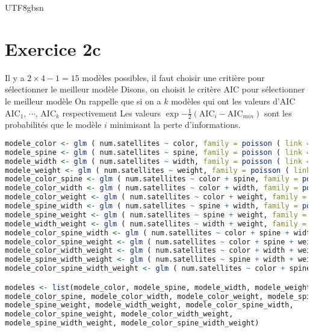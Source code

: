 \documentclass[../main.tex]{subfiles}
\begin{document}
\begin{CJK*}{UTF8}{gbsn}
\section*{Exercice 2c}
 Il y a $2 \times 4-1=15$ modèles possibles, il faut choisir une critière pour sélectionner le meilleur modèle
Disons, on choisit le critère AIC pour sélectionner le meilleur modèle
On rappelle que si on a $k$ modèles qui ont les valeurs d'AIC $\text{AIC}_1$, $\cdots$, $\text{AIC}_k$ respectivement
Les valeurs $\exp{-\frac{1}{2}(\text{AIC}_i - \text{AIC}_{min})}$ sont les probabilités que le modèle $i$
minimisant la perte d'informations.

\begin {lstlisting}[language=R]
modele_color <- glm ( num.satellites ~ color, family = poisson ( link = log ) ,data = hcrabs ) 
modele_spine <- glm ( num.satellites ~ spine, family = poisson ( link = log ) ,data = hcrabs )
modele_width <- glm ( num.satellites ~ width, family = poisson ( link = log ) ,data = hcrabs )
modele_weight <- glm ( num.satellites ~ weight, family = poisson ( link = log ) ,data = hcrabs )
modele_color_spine <- glm ( num.satellites ~ color + spine, family = poisson ( link = log ) ,data = hcrabs )
modele_color_width <- glm ( num.satellites ~ color + width, family = poisson ( link = log ) ,data = hcrabs )
modele_color_weight <- glm ( num.satellites ~ color + weight, family = poisson ( link = log ) ,data = hcrabs )
modele_spine_width <- glm ( num.satellites ~ spine + width, family = poisson ( link = log ) ,data = hcrabs )
modele_spine_weight <- glm ( num.satellites ~ spine + weight, family = poisson ( link = log ) ,data = hcrabs )
modele_width_weight <- glm ( num.satellites ~ width + weight, family = poisson ( link = log ) ,data = hcrabs )
modele_color_spine_width <- glm ( num.satellites ~ color + spine + width, family = poisson ( link = log ) ,data = hcrabs )
modele_color_spine_weight <- glm ( num.satellites ~ color + spine + weight, family = poisson ( link = log ) ,data = hcrabs )
modele_color_width_weight <- glm ( num.satellites ~ color + width + weight, family = poisson ( link = log ) ,data = hcrabs )
modele_spine_width_weight <- glm ( num.satellites ~ spine + width + weight, family = poisson ( link = log ) ,data = hcrabs )
modele_color_spine_width_weight <- glm ( num.satellites ~ color + spine + width + weight, family = poisson ( link = log ) ,data = hcrabs )

modeles <- list(modele_color, modele_spine, modele_width, modele_weight, 
modele_color_spine, modele_color_width, modele_color_weight, modele_spine_width, 
modele_spine_weight, modele_width_weight, modele_color_spine_width, 
modele_color_spine_weight, modele_color_width_weight, 
modele_spine_width_weight, modele_color_spine_width_weight)


\end{lstlisting}
\end{CJK*}
\end{document}
